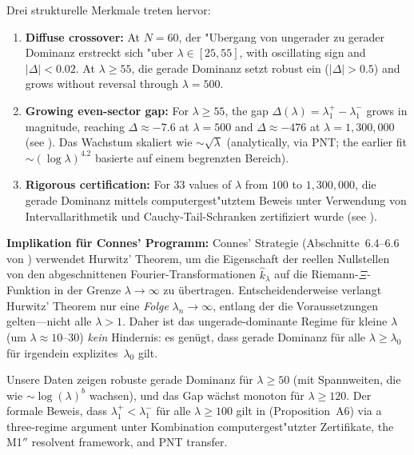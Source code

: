 \documentclass[12pt,a4paper]{article}
\theoremstyle{definition}
\theoremstyle{remark}
\begin{document}
Drei strukturelle Merkmale treten hervor:

\begin{enumerate}
  \item \textbf{Diffuse crossover:} At $N=60$, der "Ubergang von ungerader zu gerader Dominanz erstreckt sich "uber $\lambda \in [25, 55]$, with oscillating sign and $|\Delta| < 0.02$. At $\lambda \geq 55$, die gerade Dominanz setzt robust ein ($|\Delta| > 0.5$) and grows without reversal through $\lambda = 500$.

  \item \textbf{Growing even-sector gap:} For $\lambda \geq 55$, the gap $\Delta(\lambda) = \lambda_1^+ - \lambda_1^-$ grows in magnitude, reaching $\Delta \approx -7.6$ at $\lambda = 500$ and $\Delta \approx -476$ at $\lambda = 1{,}300{,}000$ (see ). Das Wachstum skaliert wie $\sim\!\sqrt{\lambda}$ (analytically, via PNT; the earlier fit $\sim\!(\log\lambda)^{4.2}$ basierte auf einem begrenzten Bereich).

  \item \textbf{Rigorous certification:} For $33$ values of $\lambda$ from $100$ to $1{,}300{,}000$, die gerade Dominanz mittels computergest"utztem Beweis unter Verwendung von Intervallarithmetik und Cauchy-Tail-Schranken zertifiziert wurde (see ).
\end{enumerate}

\textbf{Implikation für Connes' Programm:} Connes' Strategie (Abschnitte~6.4--6.6 von \cite{Connes2025}) verwendet Hurwitz' Theorem, um die Eigenschaft der reellen Nullstellen von den abgeschnittenen Fourier-Transformationen $\hat{k}_\lambda$ auf die Riemann-$\Xi$-Funktion in der Grenze $\lambda \to \infty$ zu übertragen. Entscheidenderweise verlangt Hurwitz' Theorem nur eine \emph{Folge} $\lambda_n \to \infty$, entlang der die Voraussetzungen gelten---nicht alle $\lambda > 1$. Daher ist das ungerade-dominante Regime für kleine $\lambda$ (um $\lambda \approx 10$--$30$) \emph{kein} Hindernis: es genügt, dass gerade Dominanz für alle $\lambda \geq \lambda_0$ für irgendein explizites~$\lambda_0$ gilt.

Unsere Daten zeigen robuste gerade Dominanz für $\lambda \geq 50$ (mit Spannweiten, die wie $\sim \log(\lambda)^b$ wachsen), und das Gap wächst monoton für $\lambda \geq 120$. Der formale Beweis, dass $\lambda_1^+ < \lambda_1^-$ für alle $\lambda \geq 100$ gilt in  (Proposition~A6) via a three-regime argument unter Kombination computergest"utzter Zertifikate, the M1$''$ resolvent framework, and PNT transfer.
\end{document}

